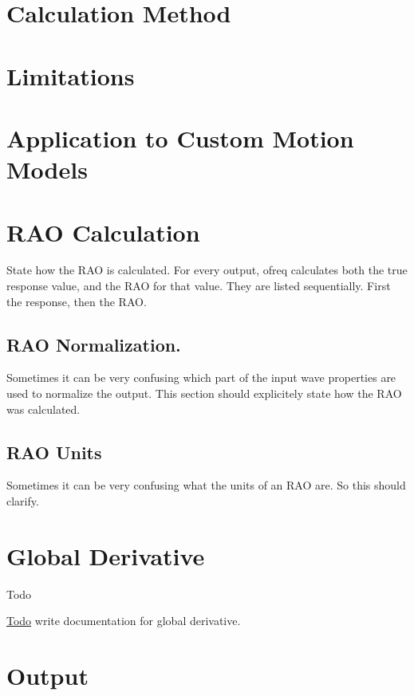 \section*{Calculation Method}

\section*{Limitations}

\section*{Application to Custom Motion Models}

\section*{R\-A\-O Calculation}

State how the R\-A\-O is calculated. For every output, ofreq calculates both the true response value, and the R\-A\-O for that value. They are listed sequentially. First the response, then the R\-A\-O.

\subsection*{R\-A\-O Normalization.}

Sometimes it can be very confusing which part of the input wave properties are used to normalize the output. This section should explicitely state how the R\-A\-O was calculated.

\subsection*{R\-A\-O Units}

Sometimes it can be very confusing what the units of an R\-A\-O are. So this should clarify. \hypertarget{global_derivative}{}\section{Global Derivative}\label{global_derivative}
\begin{DoxyRefDesc}{Todo}
\item[\hyperlink{todo__todo000013}{Todo}]write documentation for global derivative.\end{DoxyRefDesc}


\section*{Output}

